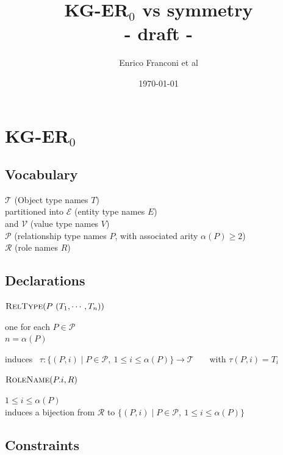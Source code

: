 \documentclass[10pt]{article}
\title{\vspace{-4ex}KG-ER$_0$ vs symmetry\\ - draft -}
\author{Enrico Franconi et al}
\date{\today}
\begin{document}
\maketitle



\section{KG-ER$_0$ %
}


\subsection*{Vocabulary}
$\mathcal{T}$ (Object type names $T$) \\
\phantom{}\hspace{1em}
partitioned into $\mathcal{E}$ (entity type names $E$) \\
\phantom{}\hspace{1em}
and $\mathcal{V}$ (value type names $V$)\\
$\mathcal{P}$ (relationship type names $P$, with associated arity $\alpha(P)\geq 2$)\\
$\mathcal{R}$ (role names $R$)

\noindent


\subsection*{Declarations}

\noindent
$\textsc{RelType}(P\ (T_1, \cdots , T_n))$ 
~~~~~{ 
\parbox[t]{\textwidth}{%
one for each $P\in\mathcal{P}$\\
$n=\alpha(P)$\\
\parbox[t]{\textwidth}{%
induces~ 
$\tau:\{(P,i)\mid P\in\mathcal P,\ 1\leq i\leq\alpha(P)\}\to\mathcal T$ ~~~with $\tau(P,i)=T_i$}}}

\noindent
$\textsc{RoleName}(P.i, R)$ 
~~~~~~~~~~~~~~~~~~~~~~~{ 
\parbox[t]{\textwidth}{%
$1\leq i\leq \alpha(P)$\\
induces a bijection from $\mathcal{R}$ to 
$\displaystyle\{(P,i)\mid P\in\mathcal P,\ 1\leq i\leq\alpha(P)\}$
}}


\subsection*{Constraints}
\end{document}
